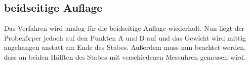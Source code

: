 \subsection{beidseitige Auflage}
Das Verfahren wird analog für die beidseitige Auflage wiederholt. Nun liegt der Probekörper jedoch auf den Punkten A und B auf und das Gewicht wird mittig 
angehangen anstatt am Ende des Stabes. Außerdem muss nun beachtet werden, dass an beiden Hälften des Stabes mit verschiedenen Messuhren gemessen wird.




